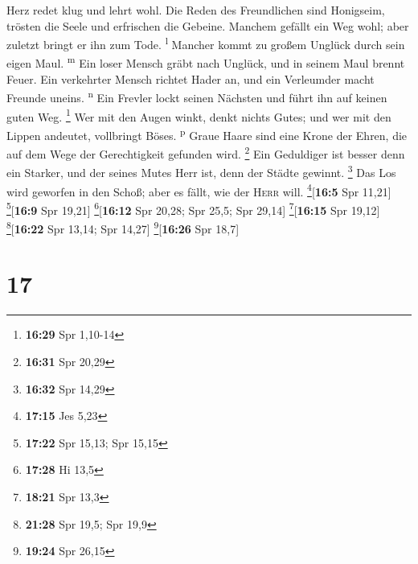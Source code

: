 Herz redet klug und lehrt wohl.  Die Reden des
Freundlichen sind Honigseim, trösten die Seele und erfrischen die
Gebeine.  Manchem gefällt ein Weg wohl; aber zuletzt
bringt er ihn zum Tode. \textsuperscript{l}  Mancher
kommt zu großem Unglück durch sein eigen Maul. \textsuperscript{m}
 Ein loser Mensch gräbt nach Unglück, und in seinem Maul
brennt Feuer.  Ein verkehrter Mensch richtet Hader an,
und ein Verleumder macht Freunde uneins. \textsuperscript{n}
 Ein Frevler lockt seinen Nächsten und führt ihn auf
keinen guten Weg. \footnote{\textbf{16:29} Spr 1,10-14} 
Wer mit den Augen winkt, denkt nichts Gutes; und wer mit den Lippen
andeutet, vollbringt Böses. \textsuperscript{p}  Graue
Haare sind eine Krone der Ehren, die auf dem Wege der Gerechtigkeit
gefunden wird. \footnote{\textbf{16:31} Spr 20,29}  Ein
Geduldiger ist besser denn ein Starker, und der seines Mutes Herr ist,
denn der Städte gewinnt. \footnote{\textbf{16:32} Spr 14,29}
 Das Los wird geworfen in den Schoß; aber es fällt, wie
der \textsc{Herr} will. \footnote{\textbf{17:15} Jes 5,23}{[}\textbf{16:5}
Spr 11,21{]} \footnote{\textbf{17:22} Spr 15,13; Spr 15,15}{[}\textbf{16:9}
Spr 19,21{]} \footnote{\textbf{17:28} Hi 13,5}{[}\textbf{16:12} Spr
20,28; Spr 25,5; Spr 29,14{]} \footnote{\textbf{18:21} Spr 13,3}{[}\textbf{16:15}
Spr 19,12{]} \footnote{\textbf{21:28} Spr 19,5; Spr 19,9}{[}\textbf{16:22}
Spr 13,14; Spr 14,27{]} \footnote{\textbf{19:24} Spr 26,15}{[}\textbf{16:26}
Spr 18,7{]}

\hypertarget{section-16}{%
\section{17}\label{section-16}}

